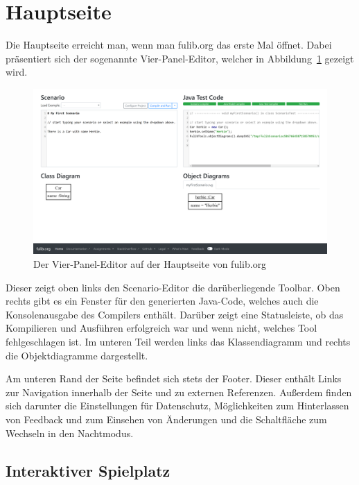 \section{Hauptseite}\label{sec:main-page}

Die Hauptseite erreicht man, wenn man fulib.org das erste Mal öffnet.
Dabei präsentiert sich der sogenannte Vier-Panel-Editor, welcher in Abbildung~\ref{fig:four-pane-editor} gezeigt wird.

\begin{figure}
    \includegraphics[width=\textwidth]{chapter/fulib.org/img/four-pane-editor.png}
    \caption{Der Vier-Panel-Editor auf der Hauptseite von fulib.org}
    \label{fig:four-pane-editor}
\end{figure}

Dieser zeigt oben links den Scenario-Editor die darüberliegende Toolbar.
Oben rechts gibt es ein Fenster für den generierten Java-Code, welches auch die Konsolenausgabe des Compilers enthält.
Darüber zeigt eine Statusleiste, ob das Kompilieren und Ausführen erfolgreich war und wenn nicht, welches Tool fehlgeschlagen ist.
Im unteren Teil werden links das Klassendiagramm und rechts die Objektdiagramme dargestellt.

Am unteren Rand der Seite befindet sich stets der Footer.
Dieser enthält Links zur Navigation innerhalb der Seite und zu externen Referenzen.
Außerdem finden sich darunter die Einstellungen für Datenschutz,
Möglichkeiten zum Hinterlassen von Feedback und zum Einsehen von Änderungen
und die Schaltfläche zum Wechseln in den Nachtmodus.

\subsection{Interaktiver Spielplatz}\label{subsec:interactive-playground}


